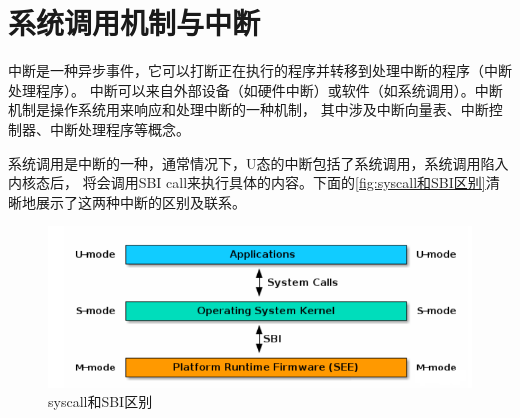\section{系统调用机制与中断}

中断是一种异步事件，它可以打断正在执行的程序并转移到处理中断的程序（中断处理程序）。
中断可以来自外部设备（如硬件中断）或软件（如系统调用）。中断机制是操作系统用来响应和处理中断的一种机制，
其中涉及中断向量表、中断控制器、中断处理程序等概念。

系统调用是中断的一种，通常情况下，U态的中断包括了系统调用，系统调用陷入内核态后，
将会调用SBI call来执行具体的内容。下面的\autoref{fig:syscall和SBI区别}清晰地展示了这两种中断的区别及联系。

\begin{figure}[htb]
    \centering
    \includegraphics[width=\textwidth]{figures/03-03-syscall和SBI区别.png}
    \caption{
        syscall和SBI区别
    }
    \label{fig:syscall和SBI区别}
\end{figure}